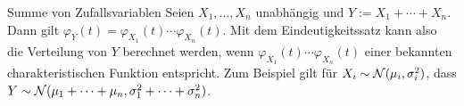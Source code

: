 \begin{Def}{Summe von Zufallsvariablen}
    Seien $X_1, \dotsc, X_n$ unabhängig und $Y := X_1 + \dotsb + X_n$.\\
    Dann gilt $\varphi_Y(t) = \varphi_{X_1}(t) \dotsm \varphi_{X_n}(t)$.
    Mit dem Eindeutigkeitssatz kann also die Verteilung von $Y$ berechnet werden,
    wenn $\varphi_{X_1}(t) \dotsm \varphi_{X_n}(t)$ einer bekannten charakteristischen Funktion
    entspricht.
    Zum Beispiel gilt für $X_i \sim \mathcal{N}(\mu_i, \sigma_i^2)$, dass
    $Y \sim \mathcal{N}(\mu_1 + \dotsb + \mu_n, \sigma_1^2 + \dotsb + \sigma_n^2)$.
\end{Def}

\pagebreak
